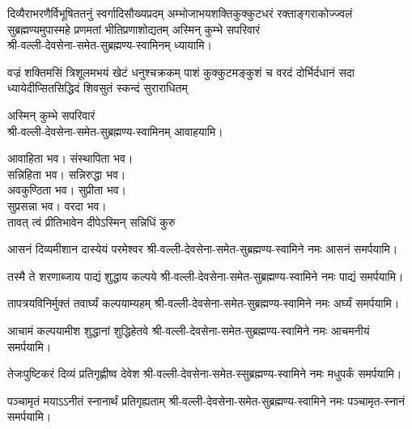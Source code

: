 \begin{center}

{दिव्यैराभरणैर्विभूषिततनुं स्वर्गादिसौख्यप्रदम्}
{अम्भोजाभयशक्तिकुक्कुटधरं रक्ताङ्गराकोज्ज्वलं}
{सुब्रह्मण्यमुपास्महे प्रणमतां भीतिप्रणाशोद्यतम्}
\nobreak%
अस्मिन् कुम्भे सपरिवारं\\
श्री-वल्ली-देवसेना-समेत-सुब्रह्मण्य-स्वामिनम् ध्यायामि।

{वज्रं शक्तिमसिं त्रिशूलमभयं खेटं धनुश्चक्रकम्}
{पाशं कुक्कुटमङ्कुशं च वरदं दोर्भिर्दधानं सदा}
{ध्यायेदीप्सितसिद्धिदं शिवसुतं स्कन्दं सुराराधितम्}

\nobreak%
अस्मिन् कुम्भे सपरिवारं\\
श्री-वल्ली-देवसेना-समेत-सुब्रह्मण्य-स्वामिनम् आवाहयामि। 

आवाहिता भव। संस्थापिता भव।\\
सन्निहिता भव। सन्निरुद्धा भव।\\
अवकुण्ठिता भव। सुप्रीता भव।\\
सुप्रसन्ना भव। वरदा भव।\\

{तावत् त्वं प्रीतिभावेन दीपेऽस्मिन् सन्निधिं कुरु}

{आसनं दिव्यमीशान दास्येयं परमेश्वर}
\nobreak%
श्री-वल्ली-देवसेना-समेत-सुब्रह्मण्य-स्वामिने
नमः आसनं समर्पयामि।

{तस्मै ते शरणाब्जाय पाद्यं शुद्धाय कल्पये}
\nobreak%
श्री-वल्ली-देवसेना-समेत-सुब्रह्मण्य-स्वामिने
नमः पाद्यं समर्पयामि।

{तापत्रयविनिर्मुक्तं तवार्घ्यं कल्पयाम्यहम्}
\nobreak%
 श्री-वल्ली-देवसेना-समेत-सुब्रह्मण्य-स्वामिने
 नमः अर्घ्यं समर्पयामि।

{आचामं कल्पयामीश शुद्धानां शुद्धिहेतवे}
\nobreak%
श्री-वल्ली-देवसेना-समेत-सुब्रह्मण्य-स्वामिने
नमः आचमनीयं समर्पयामि।

{तेजःपुष्टिकरं दिव्यं प्रतिगृह्णीष्व देवेश}
\nobreak%
श्री-वल्ली-देवसेना-समेत-स्सुब्रह्मण्य-स्वामिने
नमः मधुपर्कं समर्पयामि।

{पञ्चामृतं मयाऽऽनीतं स्नानार्थं प्रतिगृह्यताम्}
\nobreak%
श्री-वल्ली-देवसेना-समेत-सुब्रह्मण्य-स्वामिने
नमः पञ्चामृत-स्नानं समर्पयामि।


\end{center}
